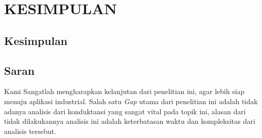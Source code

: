 \chapter{KESIMPULAN}
\RaggedRight\section{Kesimpulan}
\justifying
\lipsum
\section{Saran}
Kami Sangatlah mengharapkan kelanjutan dari penelitian ini, agar lebih siap menuju aplikasi industrial. Salah satu \textit{Gap} utama dari penelitian ini adalah tidak adanya analisis dari konduktansi yang sangat vital pada topik ini, alasan dari tidak dilakukannya analisis ini adalah keterbatasan waktu dan kompleksitas dari analisis tersebut.
